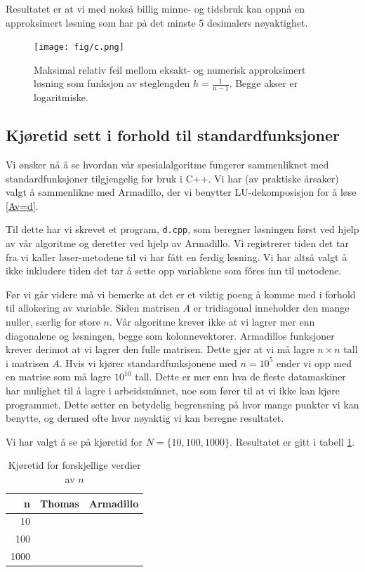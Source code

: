\documentclass[11pt]{article}
\begin{document}
Resultatet er at vi med nokså billig minne- og tidsbruk kan oppnå en
approksimert løsning som har på det minste 5 desimalers
nøyaktighet. 

\begin{figure}[ht]
  \centering
  \texttt{[image: fig/c.png]}
  \caption{\label{fig:c} Maksimal relativ feil mellom eksakt-
    og numerisk approksimert løsning som funksjon av steglengden $h =
    \frac{ 1 }{ n-1 }$. Begge akser er logaritmiske.}
\end{figure}


\subsection{Kjøretid sett i forhold til standardfunksjoner}
Vi ønsker nå å se hvordan vår spesialalgoritme fungerer sammenliknet
med standardfunksjoner tilgjengelig for bruk i C++. Vi har (av
praktiske årsaker) valgt å sammenlikne med Armadillo, der vi benytter
LU-dekomposisjon for å løse \eqref{Av=d}. 

Til dette har vi skrevet et program, \texttt{d.cpp}, som beregner
løsningen først ved hjelp av vår algoritme og deretter ved hjelp av
Armadillo. Vi registrerer tiden det tar fra vi kaller løser-metodene
til vi har fått en ferdig løsning. Vi har altså valgt å ikke inkludere
tiden det tar å sette opp variablene som fôres inn til metodene. 

Før vi går videre må vi bemerke at det er et viktig poeng å komme med
i forhold til allokering av variable. Siden matrisen $A$ er
tridiagonal inneholder den mange nuller, særlig for store $n$. Vår
algoritme krever ikke at vi lagrer mer enn diagonalene og løsningen,
begge som kolonnevektorer. Armadillos funksjoner krever derimot at vi
lagrer den fulle matrisen. Dette gjør at vi må lagre $n\times n$ tall
i matrisen $A$. Hvis vi kjører standardfunksjonene med $n=10^5$ ender
vi opp med en matrise som må lagre $10^{10}$ tall. Dette er mer enn
hva de fleste datamaskiner har mulighet til å lagre i arbeidsminnet,
noe som fører til at vi ikke kan kjøre programmet. Dette setter en
betydelig begrensning på hvor mange punkter vi kan benytte, og dermed
ofte hvor nøyaktig vi kan beregne resultatet.

Vi har valgt å se på kjøretid for $N = \{10, 100, 1000\}$. Resultatet
er gitt i tabell \ref{tab:1}.
\begin{table}[h]
\centering
\caption{Kjøretid for forskjellige verdier av $n$}
\label{tab:1}
\vspace{0.1cm}
\begin{tabular}{rll}
n & Thomas & Armadillo \\
\hline
10 &  &  \\
100 &  &  \\
1000 &  &  \\
\end{tabular}
\end{table}
\end{document}
